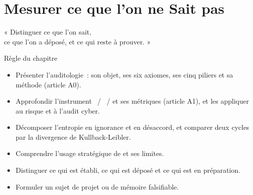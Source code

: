 
\chapter{Mesurer ce que l'on ne Sait pas}
\label{chap:auditologie}

\epigraph{%
    « Distinguer ce que l'on sait,\\
    ce que l'on a déposé, et ce qui reste à prouver. »%
}{Règle du chapitre}


\begin{boxobjectifs}
\begin{itemize}
    \item Présenter l'auditologie~: son objet, ses six axiomes, ses cinq
          piliers et sa méthode (article A0).
    \item Approfondir l'instrument \OUI{}~/ \NON{}~/ \NEK{} et ses métriques
          (article A1), et les appliquer au risque et à l'audit cyber.
    \item Décomposer l'entropie en ignorance et en désaccord, et comparer
          deux cycles par la divergence de Kullback-Leibler.
    \item Comprendre l'usage stratégique de \NEK{} et ses limites.
    \item Distinguer ce qui est établi, ce qui est déposé et ce qui est en
          préparation.
    \item Formuler un sujet de projet ou de mémoire falsifiable.
\end{itemize}
\end{boxobjectifs}

